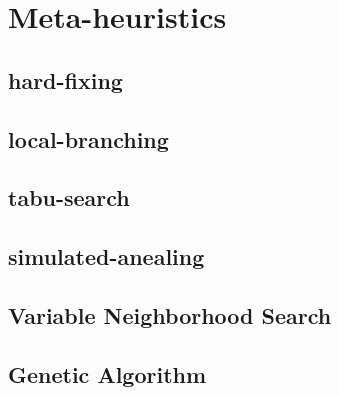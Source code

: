 \chapter{Meta-heuristics}

\section{hard-fixing}
\section{local-branching}
\section{tabu-search}
\section{simulated-anealing}
\section{Variable Neighborhood Search}
\section{Genetic Algorithm}
